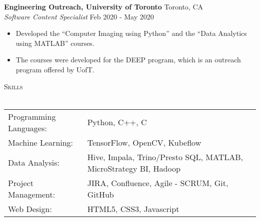 \documentclass[a4paper]{article}
\newcommand{\lineunder} {
    \vspace*{-8pt} \\
    \hspace*{-18pt} \hrulefill \\
}
\newcommand{\header} [1] {
    {\hspace*{-18pt}\vspace*{6pt} \textsc{#1}}
    \vspace*{-6pt} \lineunder
}
\begin{document}
\textbf{Engineering Outreach, University of Toronto} \hfill Toronto, CA\\
\textit{Software Content Specialist} \hfill Feb 2020 - May 2020\\
\vspace{-1mm}
\begin{itemize} \itemsep 1pt
	\item Developed the “Computer Imaging using Python” and the “Data Analytics using MATLAB” courses.
	\item The courses were developed for the DEEP program, which is an outreach program offered by UofT.
\end{itemize}

\header{Skills}
\begin{tabular}{ l l }
	Programming Languages: & Python, C++, C                                                   \\
	Machine Learning:      & TensorFlow, OpenCV, Kubeflow                                     \\
	Data Analysis:         & Hive, Impala, Trino/Presto SQL, MATLAB, MicroStrategy BI, Hadoop \\
	Project Management:    & JIRA, Confluence, Agile - SCRUM, Git, GitHub                     \\
	Web Design:            & HTML5, CSS3, Javascript                                          \\
\end{tabular}
\vspace{2mm}
\end{document}
